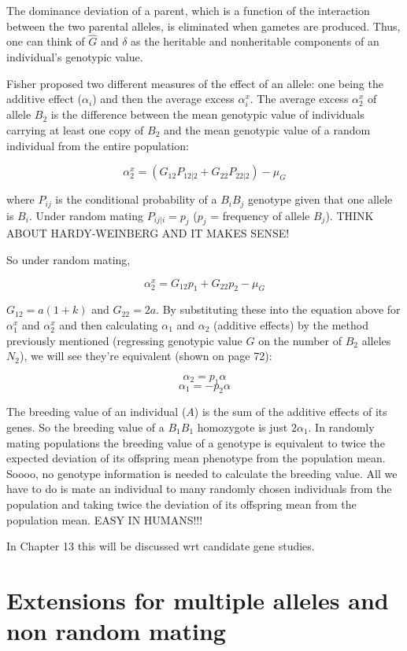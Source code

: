 \documentclass[
]{book}
\begin{document}
The dominance deviation of a parent, which is a function of the interaction between the two parental alleles, is eliminated when gametes are produced. Thus, one can think of \(\hat{G}\) and \(\delta\) as the heritable and nonheritable components of an individual's genotypic value.

Fisher proposed two different measures of the effect of an allele: one being the additive effect (\(\alpha_i\)) and then the average excess \(\alpha^x_i\). The average excess \(\alpha^x_2\) of allele \(B_2\) is the difference between the mean genotypic value of individuals carrying at least one copy of \(B_2\) and the mean genotypic value of a random individual from the entire population:

\[ \alpha^x_2 = (G_{12}P_{12|2} + G_{22}P_{22|2}) - \mu_G \]

where \(P_{ij}\) is the conditional probability of a \(B_iB_j\) genotype given that one allele is \(B_i\). Under random mating \(P_{ij|i} = p_j\) (\(p_j\) = frequency of allele \(B_j\)). THINK ABOUT HARDY-WEINBERG AND IT MAKES SENSE!

So under random mating,

\[ \alpha^x_2 = G_{12}p_1 + G_{22}p_2 - \mu_G \]

\(G_{12} = a(1+k)\) and \(G_{22} = 2a\). By substituting these into the equation above for \(\alpha^x_1\) and \(\alpha^x_2\) and then calculating \(\alpha_1\) and \(\alpha_2\) (additive effects) by the method previously mentioned (regressing genotypic value \(G\) on the number of \(B_2\) alleles \(N_2\)), we will see they're equivalent (shown on page 72):

\[ \alpha_2 = p_1\alpha \]
\[ \alpha_1 = -p_2\alpha \]

The breeding value of an individual (\(A\)) is the sum of the additive effects of its genes. So the breeding value of a \(B_1B_1\) homozygote is just \(2\alpha_1\). In randomly mating populations the breeding value of a genotype is equivalent to twice the expected deviation of its offspring mean phenotype from the population mean. Soooo, no genotype information is needed to calculate the breeding value. All we have to do is mate an individual to many randomly chosen individuals from the population and taking twice the deviation of its offspring mean from the population mean. EASY IN HUMANS!!!

In Chapter 13 this will be discussed wrt candidate gene studies.

\hypertarget{extensions-for-multiple-alleles-and-non-random-mating}{%
\section{Extensions for multiple alleles and non random mating}\label{extensions-for-multiple-alleles-and-non-random-mating}}
\end{document}
